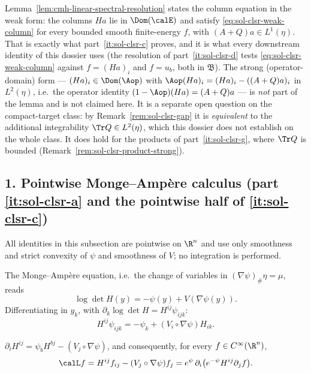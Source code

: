 \documentclass[../main.tex]{subfiles}
\begin{document}
\begin{remark}
\label{rem:sol-clsr-weak-vs-strong}
Lemma~\ref{lem:cmh-linear-spectral-resolution} states the column equation in the weak form:
the columns $Ha$ lie in $\Dom(\calE)$ and satisfy \eqref{eq:sol-clsr-weak-column} for every
bounded smooth finite-energy $f$, with $(A+Q)a\in L^1(\eta)$.  That is exactly what
part~\ref{it:sol-clsr-c} proves, and it is what every downstream identity of this dossier
uses (the resolution of part~\ref{it:sol-clsr-d} tests \eqref{eq:sol-clsr-weak-column}
against $f=(Ha)_i$ and $f=u_b$, both in $\mathfrak B$).  The strong (operator-domain) form
--- $(Ha)_i\in\Dom(\Aop)$ with $\Aop(Ha)_i=(Ha)_i-((A+Q)a)_i$ in $L^2(\eta)$, i.e.\ the
operator identity $(1-\Aop)(Ha)=(A+Q)a$ --- is \emph{not} part of the lemma and is not
claimed here.  It is a separate open question on the compact-target class: by
Remark~\ref{rem:sol-clsr-gap} it is \emph{equivalent} to the additional integrability
$\Tr Q\in L^2(\eta)$, which this dossier does not establish on the whole class.  It does hold
for the products of part~\ref{it:sol-clsr-g}, where $\Tr Q$ is bounded
(Remark~\ref{rem:sol-clsr-product-strong}).
\end{remark}

\subsection*{1. Pointwise Monge--Amp\`ere calculus (part \ref{it:sol-clsr-a} and the
pointwise half of \ref{it:sol-clsr-c})}

All identities in this subsection are pointwise on $\R^n$ and use only smoothness and strict
convexity of $\psi$ and smoothness of $V$; no integration is performed.

The Monge--Amp\`ere equation, i.e.\ the change of variables in $(\nabla\psi)_\#\eta=\mu$, reads
\begin{equation}
  \log\det H(y)=-\psi(y)+V(\nabla\psi(y)) .
  \label{eq:sol-clsr-MA}
\end{equation}
Differentiating in $y_k$, with $\partial_k\log\det H=H^{ij}\psi_{ijk}$:
\begin{equation}
  H^{ij}\psi_{ijk}=-\psi_k+(V_i\circ\nabla\psi)H_{ik} .
  \tag{MA1}
  \label{eq:sol-clsr-MA1}
\end{equation}

\begin{lemma}
\label{lem:sol-clsr-symmetric-form}
$\partial_iH^{ij}=\psi_bH^{bj}-(V_j\circ\nabla\psi)$, and consequently, for every
$f\in C^\infty(\R^n)$,
\[
  \calL f=H^{ij}f_{ij}-(V_j\circ\nabla\psi)f_j
  =e^{\psi}\,\partial_i\bigl(e^{-\psi}H^{ij}\partial_jf\bigr).
\]
\end{lemma}
\end{document}

